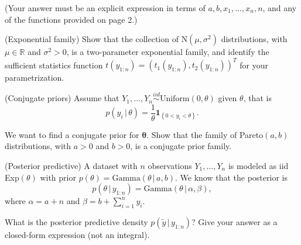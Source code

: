 \documentclass[12pt]{article}\usepackage[]{graphicx}\usepackage[]{color}
\newcommand{\mbs}[1]{\boldsymbol{#1}}
\newcommand{\btheta}{{\mbs{\theta}}}
\newcommand{\1}{\mbs{1}}
\newcommand{\0}{\mbs{0}}
\newcommand{\lrb}[1]{\left\{#1\right\}}
\newcommand{\tN}{\text{N}}
\newcommand{\given}{\,|\,}
\theoremstyle{definition}
\begin{document}
(Your answer must be an explicit expression in terms of $a, b, x_1,\ldots,x_n, n$, and any of the functions provided on page 2.)


\item (Exponential family) Show that the collection of $\tN(\mu,\sigma^2)$ distributions, with $\mu\in\mathbb{R}$ and  $\sigma^2>0$, is a two-parameter exponential family, and identify the sufficient statistics function $t(y_{1:n}) = (t_1(y_{1:n}), t_2(y_{1:n}))^T$ for your parametrization.

\item (Conjugate priors) Assume that $Y_1,\ldots,Y_n\overset{iid}{\sim}\text{Uniform}(0,\theta)$ given $\theta$, that is
$$p(y_i\given \theta)= \frac{1}{\theta}\1_{\lrb{0< y_i < \theta}}. $$

We want to find a conjugate prior for $\btheta$. Show that the family of Pareto$(a,b)$ distributions, with $a> 0$ and $b > 0$, is a conjugate prior family.


\item (Posterior predictive) A dataset with $n$ observations $Y_1,\ldots,Y_n$ is modeled as iid Exp$(\theta)$ with prior $p(\theta) = \text{Gamma}(\theta \given a, b)$. We know that the posterior is $$p(\theta\given y_{1:n}) = \text{Gamma}(\theta\given \alpha, \beta),$$ where $\alpha = a + n$ and $\beta = b + \sum_{i=1}^n y_i$.

What is the posterior predictive density $p(\tilde{y}\given y_{1:n})$? Give your answer as a closed-form expression (not an integral).
\end{document}
